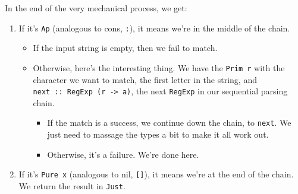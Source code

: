 \documentclass[]{article}
\newenvironment{Shaded}{}{}
\newcommand{\CommentTok}[1]{\textcolor[rgb]{0.38,0.63,0.69}{\textit{#1}}}
\newcommand{\DataTypeTok}[1]{\textcolor[rgb]{0.56,0.13,0.00}{#1}}
\newcommand{\FunctionTok}[1]{\textcolor[rgb]{0.02,0.16,0.49}{#1}}
\newcommand{\KeywordTok}[1]{\textcolor[rgb]{0.00,0.44,0.13}{\textbf{#1}}}
\newcommand{\NormalTok}[1]{#1}
\newcommand{\OtherTok}[1]{\textcolor[rgb]{0.00,0.44,0.13}{#1}}
\begin{document}
In the end of the very mechanical process, we get:

\begin{Shaded}
\end{Shaded}

\begin{enumerate}
\def\labelenumi{\arabic{enumi}.}
\item
  If it's \texttt{Ap} (analogous to cons, \texttt{:}), it means we're in the
  middle of the chain.

  \begin{itemize}
  \tightlist
  \item
    If the input string is empty, then we fail to match.
  \item
    Otherwise, here's the interesting thing. We have the \texttt{Prim\ r} with
    the character we want to match, the first letter in the string, and
    \texttt{next\ ::\ RegExp\ (r\ -\textgreater{}\ a)}, the next \texttt{RegExp}
    in our sequential parsing chain.

    \begin{itemize}
    \tightlist
    \item
      If the match is a success, we continue down the chain, to \texttt{next}.
      We just need to massage the types a bit to make it all work out.
    \item
      Otherwise, it's a failure. We're done here.
    \end{itemize}
  \end{itemize}
\item
  If it's \texttt{Pure\ x} (analogous to nil, \texttt{{[}{]}}), it means we're
  at the end of the chain. We return the result in \texttt{Just}.
\end{enumerate}
\end{document}
